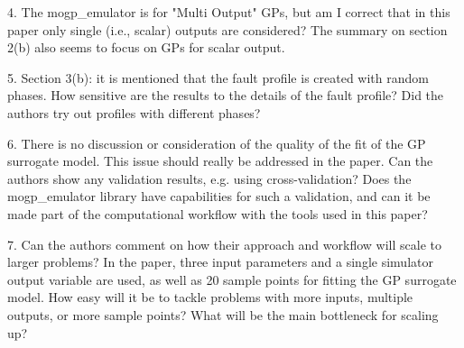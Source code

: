 \documentclass{article}
\begin{document}
4. The mogp\_emulator is for "Multi Output" GPs, but am I correct that in this paper only single (i.e., scalar) outputs are considered? The summary on section 2(b) also seems to focus on GPs for scalar output.

5. Section 3(b): it is mentioned that the fault profile is created with random phases. How sensitive are the results to the details of the fault profile? Did the authors try out profiles with different phases?

6. There is no discussion or consideration of the quality of the fit of the GP surrogate model. This issue should really be addressed in the paper. Can the authors show any validation results, e.g. using cross-validation? Does the mogp\_emulator library have capabilities for such a validation, and can it be made part of the computational workflow with the tools used in this paper?

7. Can the authors comment on how their approach and workflow will scale to larger problems? In the paper, three input parameters and a single simulator output variable are used, as well as 20 sample points for fitting the GP surrogate model. How easy will it be to tackle problems with more inputs, multiple outputs, or more sample points? What will be the main bottleneck for scaling up?
\end{document}
